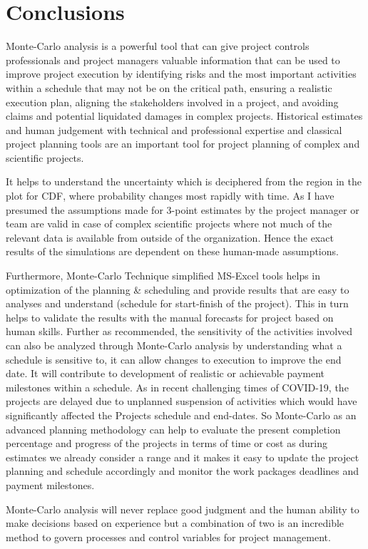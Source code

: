 \let\textcircled=\pgftextcircled
\chapter{Conclusions}
\label{chap:annex}
Monte-Carlo analysis is a powerful tool that can give project controls professionals and project managers valuable information that can be used to improve project execution by identifying risks and the most important activities within a schedule that may not be on the critical path, ensuring a realistic execution plan, aligning the stakeholders involved in a project, and avoiding claims and potential liquidated damages in complex projects. Historical estimates and human judgement with technical and professional expertise and classical project planning tools are an important tool for project planning of complex and scientific projects.

It helps to understand the uncertainty which is deciphered from the region in the plot for CDF, where probability changes most rapidly with time. As I have presumed the assumptions made for 3-point estimates by the project manager or team are valid in case of complex scientific projects where not much of the relevant data is available from outside of the organization. Hence the exact results of the simulations are dependent on these human-made assumptions.

Furthermore, Monte-Carlo Technique simplified MS-Excel tools helps in optimization of the planning \& scheduling and provide results that are easy to analyses and understand (schedule for start-finish of the project). This in turn helps to validate the results with the manual forecasts for project based on human skills. Further as recommended, the sensitivity of the activities involved can also be analyzed through Monte-Carlo analysis by understanding what a schedule is sensitive to, it can allow changes to execution to improve the end date. It will contribute to development of realistic or achievable payment milestones within a schedule. As in recent challenging times of COVID-19, the projects are delayed due to unplanned suspension of activities which would have significantly affected the Projects schedule and end-dates. So Monte-Carlo as an advanced planning methodology can help to evaluate the present completion percentage and progress of the projects in terms of time or cost as during estimates we already consider a range and it makes it easy to update the project planning and schedule accordingly and monitor the work packages deadlines and payment milestones.

Monte-Carlo analysis will never replace good judgment and the human ability to make decisions based on experience but a combination of two is an incredible method to govern processes and control variables for project management.